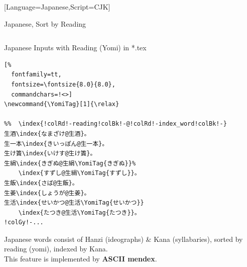 \documentclass[aspectratio=169,10pt]{beamer}
\begin{document}
\setmonofont{Noto Sans Mono CJK JP}[Language=Japanese,Script=CJK]
\begin{frame}[fragile]{Japanese, Sort by Reading}

\begin{columns}
\begin{column}{75mm}
\begin{exampleblock}{Japanese Inputs with Reading {\footnotesize(Yomi)} in *.tex}
\begin{Verbatim}[%
  fontfamily=tt,
  fontsize=\fontsize{8.0}{8.0},
  commandchars=!<>]
\newcommand{\YomiTag}[1]{\relax}

%%  \index{!colRd!-reading!colBk!-@!colRd!-index_word!colBk!-}
生酒\index{なまざけ@生酒}。
生一本\index{きいっぽん@生一本}。
生け簀\index{いけす@生け簀}。
生絹\index{きぎぬ@生絹\YomiTag{きぎぬ}}%
    \index{すずし@生絹\YomiTag{すずし}}。
生飯\index{さば@生飯}。
生姜\index{しょうが@生姜}。
生活\index{せいかつ@生活\YomiTag{せいかつ}}
    \index{たつき@生活\YomiTag{たつき}}。
!colGy!-...
\end{Verbatim}
\end{exampleblock}
{\footnotesize
Japanese words consist of Hanzi (ideographs) \& Kana (syllabaries),
sorted by reading (yomi), indexed by Kana.\\[1.0ex]
This feature is implemented by \textbf{ASCII mendex}.}
\end{column}

\begin{column}{50mm}
\begin{center}
%
\end{center}
\end{column}
\end{columns}

\end{frame}

\end{document}

